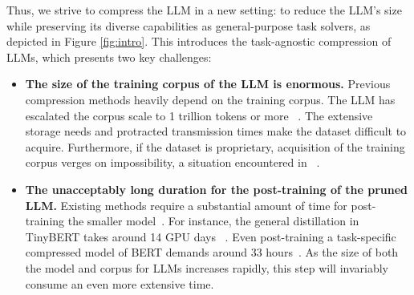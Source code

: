 \documentclass{article}
\begin{document}
Thus, we strive to compress the LLM in a new setting: to reduce the LLM's size while preserving its diverse capabilities as general-purpose task solvers, as depicted in Figure \ref{fig:intro}. This introduces the task-agnostic compression of LLMs, which presents two key challenges:
\begin{itemize}[leftmargin=*,topsep=5pt]
    \setlength{\itemsep}{1pt}
    \setlength{\parskip}{0pt}
    \setlength{\parsep}{0pt}
    \item \textbf{The size of the training corpus of the LLM is enormous.} Previous compression methods heavily depend on the training corpus. The LLM has escalated the corpus scale to 1 trillion tokens or more ~\cite{hoffmann2022training, touvron2023llama}. The extensive storage needs and protracted transmission times make the dataset difficult to acquire. Furthermore, if the dataset is proprietary, acquisition of the training corpus verges on impossibility, a situation encountered in ~\cite{zeng2022glm,openai2023gpt4}.
    \item \textbf{The unacceptably long duration for the post-training of the pruned LLM.} Existing methods require a substantial amount of time for post-training the smaller model~\cite{wang2020minilm,liang2023homodistil}. For instance, the general distillation in TinyBERT takes around 14 GPU days ~\cite{jiao2020tinybert}. Even post-training a task-specific compressed model of BERT demands around 33 hours~\cite{xia2022structured,kwon2022fast}. As the size of both the model and corpus for LLMs increases rapidly, this step will invariably consume an even more extensive time.
\end{itemize}
\end{document}
